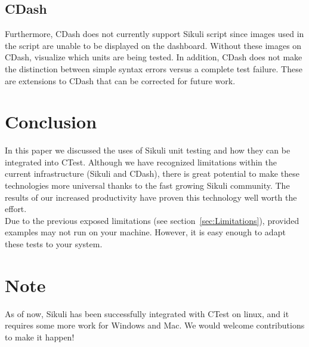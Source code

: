 \documentclass{InsightArticle}
\begin{document}
\subsection{CDash}
Furthermore, CDash does not currently support Sikuli script since images used
in the script are unable to be displayed on the dashboard.  Without these
images on CDash, visualize which units are being tested.  In addition, CDash
does not make the distinction between simple syntax errors versus a complete
test failure. These are extensions to CDash that can be corrected for future
work.

\section{Conclusion}
\label{sec:Conclusion}
In this paper we discussed the uses of Sikuli unit testing and how they can be
integrated into CTest.  Although we have recognized limitations within the
current infrastructure (Sikuli and CDash), there is great potential to make
these technologies more universal thanks to the fast growing Sikuli
community. The results of our increased productivity have proven this
technology well worth the effort.\\

Due to the previous exposed limitations (see section~\ref{sec:Limitations}),
provided examples may not run on your machine. However, it is easy enough to
adapt these tests to your system.

\section*{Note}
As of now, Sikuli has been successfully integrated with CTest on
linux, and it
requires some more work for Windows and Mac. We would welcome
contributions to make it happen!


\clearpage



\end{document}
